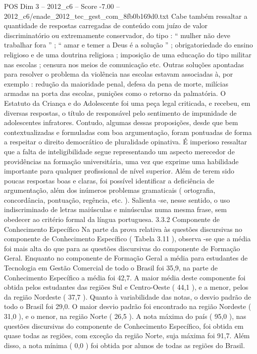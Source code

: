 \begin{textsample}{POS Dim 3 – 2012\_c6 – Score -7.00 – 2012\_c6/enade\_2012\_tec\_gest\_com\_8fb0b169d0.txt}
Cabe também ressaltar a quantidade de respostas carregadas de conteúdo com juízo de valor discriminatório ou extremamente conservador, do tipo : “ mulher não deve trabalhar fora ” ; “ amar e temer a Deus é a solução ” ; obrigatoriedade do ensino religioso e de uma doutrina religiosa ; imposição de uma educação do tipo militar nas escolas ; censura nos meios de comunicação etc.
Outras soluções apontadas para resolver o problema da violência nas escolas estavam associadas à, por exemplo : redução da maioridade penal, defesa da pena de morte, milícias armadas na porta das escolas, punições como o retorno da palmatória.
O Estatuto da Criança e do Adolescente foi uma peça legal criticada, e recebeu, em diversas respostas, o título de responsável pelo sentimento de impunidade de adolescentes infratores.
Contudo, algumas dessas proposições, desde que bem contextualizadas e formuladas com boa argumentação, foram pontuadas de forma a respeitar o direito democrático de pluralidade opinativa.
É imperioso ressaltar que a falta de inteligibilidade segue representando um aspecto merecedor de providências na formação universitária, uma vez que exprime uma habilidade importante para qualquer profissional de nível superior.
Além de terem sido poucas respostas boas e claras, foi possível identificar a deficiência de argumentação, além dos inúmeros problemas gramaticais ( ortografia, concordância, pontuação, regência, etc. ).
Salienta -se, nesse sentido, o uso indiscriminado de letras maiúsculas e minúsculas numa mesma frase, sem obedecer ao critério formal da língua portuguesa. 3.3.2 Componente de Conhecimento Específico Na parte da prova relativa às questões discursivas no componente de Conhecimento Específico ( Tabela 3.11 ), observa -se que a média foi mais alta do que para as questões discursivas do componente de Formação Geral.
Enquanto no componente de Formação Geral a média para estudantes de Tecnologia em Gestão Comercial de todo o Brasil foi 35,9, na parte de Conhecimento Específico a média foi 42,7.
A maior média deste componente foi obtida pelos estudantes das regiões Sul e Centro-Oeste ( 44,1 ), e a menor, pelos da região Nordeste ( 37,7 ).
Quanto à variabilidade das notas, o desvio padrão de todo o Brasil foi 29,0.
O maior desvio padrão foi encontrado na região Nordeste ( 31,0 ), e o menor, na região Norte ( 26,5 ).
A nota máxima do país ( 95,0 ), nas questões discursivas do componente de Conhecimento Específico, foi obtida em quase todas as regiões, com exceção da região Norte, suja máxima foi 91,7.
Além disso, a nota mínima ( 0,0 ) foi obtida por alunos de todas as regiões do Brasil.

\end{textsample}
